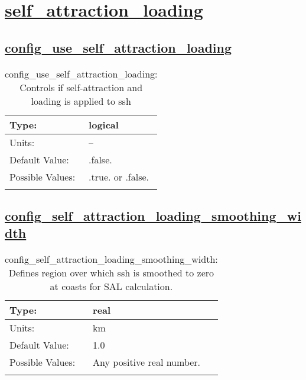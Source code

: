 \section[self\_attraction\_loading]{\hyperref[sec:nm_tab_self_attraction_loading]{self\_attraction\_loading}}
\label{sec:nm_sec_self_attraction_loading}
\subsection[config\_use\_self\_attraction\_loading]{\hyperref[sec:nm_tab_self_attraction_loading]{config\_use\_self\_attraction\_loading}}
\label{subsec:nm_sec_config_use_self_attraction_loading}
\begin{center}
\begin{longtable}{| p{2.0in} || p{4.0in} |}
    \hline
    Type: & logical \\
    \hline
    Units: & -- \\
    \hline
    Default Value: & .false. \\
    \hline
    Possible Values: & .true. or .false. \\
    \hline
    \caption{config\_use\_self\_attraction\_loading: Controls if self-attraction and loading is applied to ssh}
\end{longtable}
\end{center}
\subsection[config\_self\_attraction\_loading\_smoothing\_width]{\hyperref[sec:nm_tab_self_attraction_loading]{config\_self\_attraction\_loading\_smoothing\_width}}
\label{subsec:nm_sec_config_self_attraction_loading_smoothing_width}
\begin{center}
\begin{longtable}{| p{2.0in} || p{4.0in} |}
    \hline
    Type: & real \\
    \hline
    Units: & \si{km} \\
    \hline
    Default Value: & 1.0 \\
    \hline
    Possible Values: & Any positive real number. \\
    \hline
    \caption{config\_self\_attraction\_loading\_smoothing\_width: Defines region over which ssh is smoothed to zero at coasts for SAL calculation.}
\end{longtable}
\end{center}

